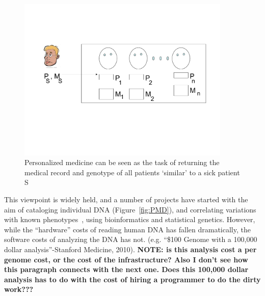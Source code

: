 \documentclass[10pt,fullpage]{article}
\begin{document}
\begin{figure}[h!]
  \centering
  \includegraphics[trim = 25mm 70mm 20mm 50mm, clip, width=4in]{fig/personalizedmedicine.pdf}
  \caption{Personalized medicine can be seen as the task of returning the medical record and genotype of all patients `similar' to a sick patient S}
  \label{fig:fig1}
\end{figure}


This viewpoint is widely held, and a number of projects have started
with the aim of cataloging individual DNA (Figure~\ref{fig:PMD}), and
correlating variations with known phenotypes~\citep{}, using
bioinformatics and statistical genetics.  However, while the
``hardware'' costs of reading human DNA has fallen dramatically, the
software costs of analyzing the DNA has not.  (e.g. ``\$100 Genome
with a 100,000 dollar analysis''-Stanford Medicine, 2010). {\bf NOTE: is
this analysis cost a per genome cost, or the cost of the
infrastructure? Also I don't see how this paragraph connects with the
next one. Does this 100,000 dollar analysis has to do with the cost of
hiring a programmer to do the dirty work???}
\end{document}
